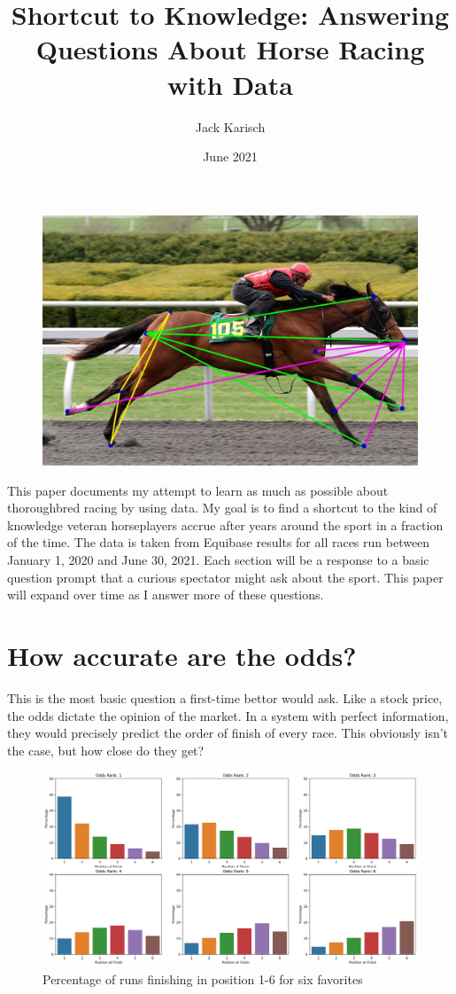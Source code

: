 \documentclass{article}
\title{Shortcut to Knowledge: Answering Questions About Horse Racing with Data}
\author{Jack Karisch}
\date{June 2021}
\begin{document}
\begin{figure}
    \centering
    \includegraphics[width=12cm]{images/horse_data_image.png}
\end{figure}

\maketitle

This paper documents my attempt to learn as much as possible about thoroughbred racing by using data. My goal is to find a shortcut to the kind of knowledge veteran horseplayers accrue after years around the sport in a fraction of the time. The data is taken from Equibase results for all races run between January 1, 2020 and June 30, 2021. Each section will be a response to a basic question prompt that a curious spectator might ask about the sport. This paper will expand over time as I answer more of these questions.

\section*{How accurate are the odds?}

This is the most basic question a first-time bettor would ask. Like a stock price, the odds dictate the opinion of the market. In a system with perfect information, they would precisely predict the order of finish of every race. This obviously isn't the case, but how close do they get?

\begin{figure}
    \centering
    \includegraphics[width=12cm]{images/odds_rank_finish_chart.png}\medskip

    \caption{Percentage of runs finishing in position 1-6 for six favorites}
    \label{figure:oddsRanksFinish}

\end{figure}
\end{document}

